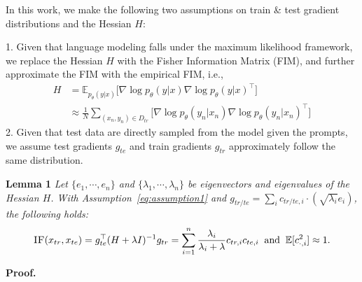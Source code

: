 \begin{assumption}
\label{eq:assumption1}
In this work, we make the following two assumptions on train \& test gradient distributions and the Hessian $H$:

1. Given that language modeling falls under the maximum likelihood framework, we replace the Hessian $H$ with the Fisher Information Matrix (FIM), and further approximate the FIM with the empirical FIM, i.e.,
\begin{align*}
    H&=\mathbb{E}_{p_\theta(y|x)}\big[\nabla\log p_\theta(y|x)\nabla\log p_\theta(y|x)^\top\big]\\[0.3ex]
    &\approx\frac{1}{N}\sum_{(x_n,y_n)\in D_{tr}}\big[\nabla\log p_\theta(y_n|x_n)\nabla\log p_\theta(y_n|x_n)^\top\big]
\end{align*}
2. Given that test data are directly sampled from the model given the prompts, we assume test gradients $g_{te}$ and train gradients $g_{tr}$ approximately follow the same distribution.
\end{assumption}

\vskip 10pt

\textbf{Lemma 1\hspace{1.5mm}} \textit{Let $\{e_1,\cdots,e_n\}$ and $\{\lambda_1,\cdots,\lambda_n\}$ be eigenvectors and eigenvalues of the Hessian $H$. With Assumption~\ref{eq:assumption1} and $g_{tr/te}=\sum_ic_{tr/te,i}\cdot(\sqrt{\lambda_i}e_i)$, the following holds:}
$$\textsc{IF}(x_{tr}, x_{te}) = g_{te}^\top (H+\lambda I)^{-1}g_{tr} = \sum_{i=1}^n\frac{\lambda_i}{\lambda_i+\lambda}c_{tr,i}c_{te,i}\;\;\text{and}\;\;\mathbb{E}[c_{\cdot,i}^2]\approx 1.$$

\textbf{Proof.\hspace{1.5mm}}

